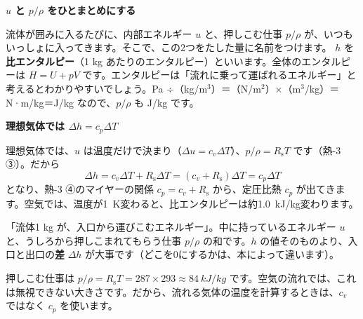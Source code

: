 \begin{bkfigure}
\label{ph:熱-4:fig-oshikomu}
\end{bkfigure}

\noindent\textbf{$u$ と $p/\rho$ をひとまとめにする}\par\nobreak
流体が囲みに入るたびに、内部エネルギー $u$ と、押しこむ仕事 $p/\rho$ が、いつもいっしょに入ってきます。そこで、この2つをたした量に名前をつけます。
\label{ph:熱-4:h}$h$ を\textbf{比エンタルピー}（1 kg あたりのエンタルピー）といいます。全体のエンタルピーは $H=U+pV$ です。エンタルピーは「流れに乗って運ばれるエネルギー」と考えるとわかりやすいでしょう。Pa ÷（kg/m$^3$）＝（N/m$^2$）×（m$^3$/kg）＝N·m/kg＝J/kg なので、$p/\rho$ も J/kg です。

\noindent\textbf{理想気体では $\Delta h=c_p\Delta T$}\par\nobreak
理想気体では、$u$ は温度だけで決まり（$\Delta u=c_v\Delta T$）、$p/\rho=R_{\mathrm s}T$ です（熱-3 ③）。だから
\[ \Delta h=c_v\Delta T+R_{\mathrm s}\Delta T=(c_v+R_{\mathrm s})\Delta T=c_p\Delta T \]
となり、熱-3 ④のマイヤーの関係 $c_p=c_v+R_{\mathrm s}$ から、定圧比熱 $c_p$ が出てきます。空気では、温度が\qty{1}{K}変わると、比エンタルピーは約\qty{1.0}{kJ/kg}変わります。

\begin{phyomi}[$h=u+p/\rho$]
「流体1 kg が、入口から運びこむエネルギー」。中に持っているエネルギー $u$ と、うしろから押しこまれてもらう仕事 $p/\rho$ の和です。$h$ の値そのものより、入口と出口の\textbf{差} $\Delta h$ が大事です（どこを0にするかは、本によって違います）。
\end{phyomi}
\begin{phmijika}
押しこむ仕事は $p/\rho=R_{\mathrm s}T=287\times293\approx\qty{84}{kJ/kg}$ です。空気の流れでは、これは無視できない大きさです。だから、流れる気体の温度を計算するときは、$c_v$ ではなく $c_p$ を使います。
\end{phmijika}

